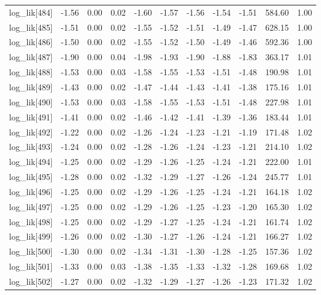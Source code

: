 \begin{table}[ht]
\begin{tabular}{rrrrrrrrrrr}
  log\_lik[484] & -1.56 & 0.00 & 0.02 & -1.60 & -1.57 & -1.56 & -1.54 & -1.51 & 584.60 & 1.00 \\ 
  log\_lik[485] & -1.51 & 0.00 & 0.02 & -1.55 & -1.52 & -1.51 & -1.49 & -1.47 & 628.15 & 1.00 \\ 
  log\_lik[486] & -1.50 & 0.00 & 0.02 & -1.55 & -1.52 & -1.50 & -1.49 & -1.46 & 592.36 & 1.00 \\ 
  log\_lik[487] & -1.90 & 0.00 & 0.04 & -1.98 & -1.93 & -1.90 & -1.88 & -1.83 & 363.17 & 1.01 \\ 
  log\_lik[488] & -1.53 & 0.00 & 0.03 & -1.58 & -1.55 & -1.53 & -1.51 & -1.48 & 190.98 & 1.01 \\ 
  log\_lik[489] & -1.43 & 0.00 & 0.02 & -1.47 & -1.44 & -1.43 & -1.41 & -1.38 & 175.16 & 1.01 \\ 
  log\_lik[490] & -1.53 & 0.00 & 0.03 & -1.58 & -1.55 & -1.53 & -1.51 & -1.48 & 227.98 & 1.01 \\ 
  log\_lik[491] & -1.41 & 0.00 & 0.02 & -1.46 & -1.42 & -1.41 & -1.39 & -1.36 & 183.44 & 1.01 \\ 
  log\_lik[492] & -1.22 & 0.00 & 0.02 & -1.26 & -1.24 & -1.23 & -1.21 & -1.19 & 171.48 & 1.02 \\ 
  log\_lik[493] & -1.24 & 0.00 & 0.02 & -1.28 & -1.26 & -1.24 & -1.23 & -1.21 & 214.10 & 1.02 \\ 
  log\_lik[494] & -1.25 & 0.00 & 0.02 & -1.29 & -1.26 & -1.25 & -1.24 & -1.21 & 222.00 & 1.01 \\ 
  log\_lik[495] & -1.28 & 0.00 & 0.02 & -1.32 & -1.29 & -1.27 & -1.26 & -1.24 & 245.77 & 1.01 \\ 
  log\_lik[496] & -1.25 & 0.00 & 0.02 & -1.29 & -1.26 & -1.25 & -1.24 & -1.21 & 164.18 & 1.02 \\ 
  log\_lik[497] & -1.25 & 0.00 & 0.02 & -1.29 & -1.26 & -1.25 & -1.23 & -1.20 & 165.30 & 1.02 \\ 
  log\_lik[498] & -1.25 & 0.00 & 0.02 & -1.29 & -1.27 & -1.25 & -1.24 & -1.21 & 161.74 & 1.02 \\ 
  log\_lik[499] & -1.26 & 0.00 & 0.02 & -1.30 & -1.27 & -1.26 & -1.24 & -1.21 & 166.27 & 1.02 \\ 
  log\_lik[500] & -1.30 & 0.00 & 0.02 & -1.34 & -1.31 & -1.30 & -1.28 & -1.25 & 157.36 & 1.02 \\ 
  log\_lik[501] & -1.33 & 0.00 & 0.03 & -1.38 & -1.35 & -1.33 & -1.32 & -1.28 & 169.68 & 1.02 \\ 
  log\_lik[502] & -1.27 & 0.00 & 0.02 & -1.32 & -1.29 & -1.27 & -1.26 & -1.23 & 171.32 & 1.02 \\ 

\end{tabular}
\end{table}
